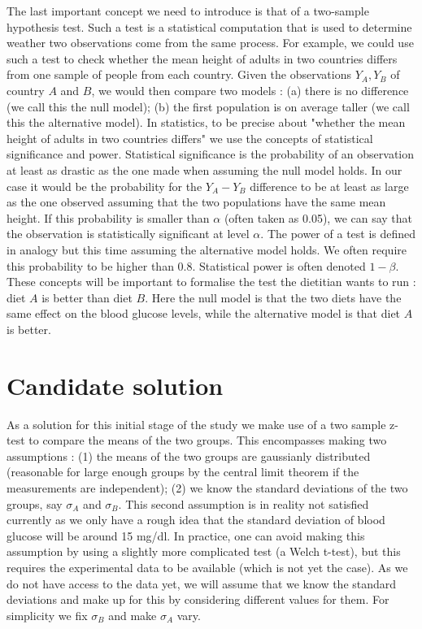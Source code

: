 \documentclass[a4paper, 12pt,oneside]{article}
\begin{document}
	The last important concept we need to introduce is that of a two-sample hypothesis test. Such a test is a statistical computation that is used to determine weather two observations come from the same process. For example, we could use such a test to check whether the mean height of adults in two countries differs from one sample of people from each country. Given the observations $Y_A,Y_B$ of country $A$ and $B$, we would then compare two models : (a) there is no difference (we call this the null model); (b) the first population is on average taller (we call this the alternative model). In statistics, to be precise about "whether the mean height of adults in two countries differs" we use the concepts of statistical significance and power. Statistical significance is the probability of an observation at least as drastic as the one made when assuming the null model holds. In our case it would be the probability for the $Y_A-Y_B$ difference to be at least as large as the one observed assuming that the two populations have the same mean height. If this probability is smaller than $\alpha$ (often taken as 0.05), we can say that the observation is statistically significant at level $\alpha$. The power of a test is defined in analogy but this time assuming the alternative model holds. We often require this probability to be higher than 0.8. Statistical power is often denoted $1-\beta$.
	These concepts will be important to formalise the test the dietitian wants to run : diet $A$ is better than diet $B$. Here the null model is that the two diets have the same effect on the blood glucose levels, while the alternative model is that diet $A$ is better. 
	\section{Candidate solution}
	As a solution for this initial stage of the study we make use of a two sample z-test to compare the means of the two groups.
	This encompasses making two assumptions : (1) the means of the two groups are gaussianly distributed (reasonable for large enough groups by the central limit theorem if the measurements are independent); (2) we know the standard deviations of the two groups, say $\sigma_A$ and $\sigma_B$. This second assumption is in reality not satisfied currently as we only have a rough idea that the standard deviation of blood glucose will be around 15 mg/dl. In practice, one can avoid making this assumption by using a slightly more complicated test (a Welch t-test), but this requires the experimental data to be available (which is not yet the case). As we do not have access to the data yet, we will assume that we know the standard deviations and make up for this by considering different values for them. For simplicity we fix $\sigma_B$ and make $\sigma_A$ vary. 
\end{document}
